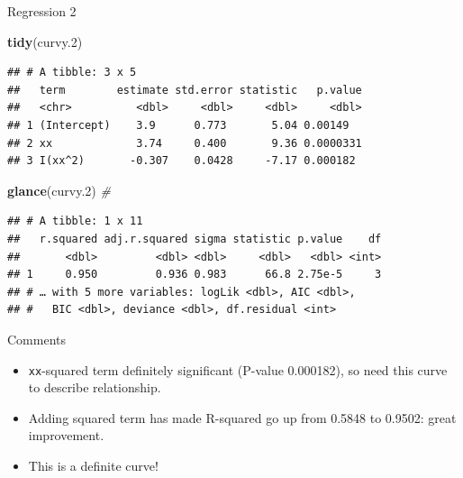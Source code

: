 \documentclass[ignorenonframetext,]{beamer}
\newenvironment{Shaded}{\begin{snugshade}}{\end{snugshade}}
\newcommand{\CommentTok}[1]{\textcolor[rgb]{0.56,0.35,0.01}{\textit{#1}}}
\newcommand{\FloatTok}[1]{\textcolor[rgb]{0.00,0.00,0.81}{#1}}
\newcommand{\KeywordTok}[1]{\textcolor[rgb]{0.13,0.29,0.53}{\textbf{#1}}}
\newcommand{\NormalTok}[1]{#1}
\begin{document}
\begin{frame}[fragile]{Regression 2}
\protect\hypertarget{regression-2}{}

\begin{Shaded}
\begin{Highlighting}[]
\KeywordTok{tidy}\NormalTok{(curvy}\FloatTok{.2}\NormalTok{)}
\end{Highlighting}
\end{Shaded}

\begin{verbatim}
## # A tibble: 3 x 5
##   term        estimate std.error statistic   p.value
##   <chr>          <dbl>     <dbl>     <dbl>     <dbl>
## 1 (Intercept)    3.9      0.773       5.04 0.00149  
## 2 xx             3.74     0.400       9.36 0.0000331
## 3 I(xx^2)       -0.307    0.0428     -7.17 0.000182
\end{verbatim}

\begin{Shaded}
\begin{Highlighting}[]
\KeywordTok{glance}\NormalTok{(curvy}\FloatTok{.2}\NormalTok{) }\CommentTok{#}
\end{Highlighting}
\end{Shaded}

\begin{verbatim}
## # A tibble: 1 x 11
##   r.squared adj.r.squared sigma statistic p.value    df
##       <dbl>         <dbl> <dbl>     <dbl>   <dbl> <int>
## 1     0.950         0.936 0.983      66.8 2.75e-5     3
## # … with 5 more variables: logLik <dbl>, AIC <dbl>,
## #   BIC <dbl>, deviance <dbl>, df.residual <int>
\end{verbatim}

\end{frame}

\begin{frame}[fragile]{Comments}
\protect\hypertarget{comments-2}{}

\begin{itemize}
\item
  \texttt{xx}-squared term definitely significant (P-value 0.000182), so
  need this curve to describe relationship.
\item
  Adding squared term has made R-squared go up from 0.5848 to 0.9502:
  great improvement.
\item
  This is a definite curve!
\end{itemize}

\end{frame}
\end{document}
